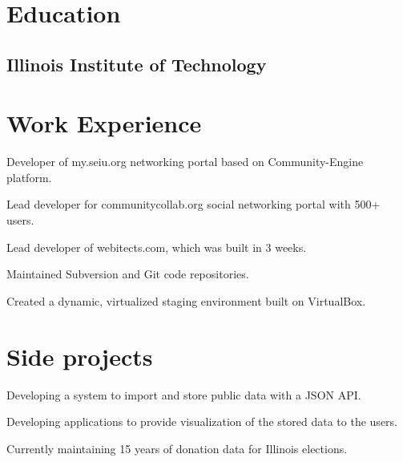 \documentclass{resume}
\begin{document}
\author{Dmitry Ratnikov}
\maketitle

\section{Education}

\subsection{Illinois Institute of Technology}


\section{Work Experience}

\begin{compactitem}
  \item Developer of my.seiu.org networking portal based on Community-Engine platform.
  \item Lead developer for communitycollab.org social networking portal with 500+ users.
  \item Lead developer of webitects.com, which was built in 3 weeks.
  \item Maintained Subversion and Git code repositories.
  \item Created a dynamic, virtualized staging environment built on VirtualBox.
\end{compactitem}

\section{Side projects}
\begin{compactitem}
  \item Developing a system to import and store public data with a JSON API.
  \item Developing applications to provide visualization of the stored data to the users.
  \item Currently maintaining 15 years of donation data for Illinois elections.
\end{compactitem}
\end{document}
